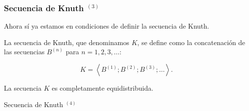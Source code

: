 \documentclass[t, 10pt, mathserif]{beamer}
\begin{document}

\begin{frame}
  \frametitle{Secuencia de Knuth {$^{(3)}$}}

  Ahora sí ya estamos en condiciones de definir la secuencia de Knuth.
  \pause

  \medskip
  \begin{definition}
    \medskip
    La secuencia de Knuth, que denominamos $K$, se define como la concatenación de las secuencias $B^{(n)}$ para $n = 1, 2, 3, \dots$:
    \pause

    \begin{equation*}
      K = \left< B^{(1)} ; B^{(2)} ;  B^{(3)} ; \dots \right> \text{.}
    \end{equation*}
  \end{definition}
  \pause

  \medskip
  \begin{theorem}
    \medskip
    La secuencia $K$ es completamente equidistribuida.
  \end{theorem}
\end{frame}


\begin{frame}{Secuencia de Knuth {$^{(4)}$}}
\end{frame}
 
\end{document}
